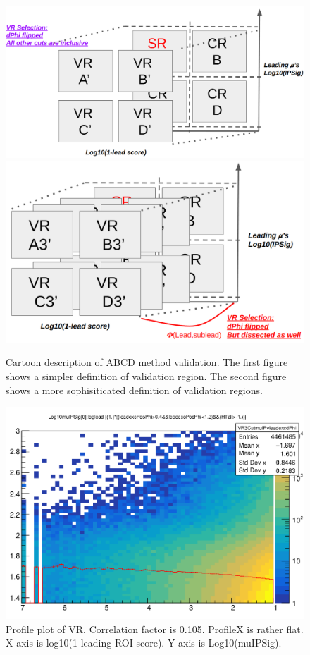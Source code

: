 \begin{figure}[h!]
  \label{fig:valcar}
  \centering
  \includegraphics[width=0.85\linewidth]{figs/SimpleVR.png}
  \includegraphics[width=0.85\linewidth]{figs/SophiVR.png}
  \caption{Cartoon description of ABCD method validation. The first figure shows a simpler definition of validation region. The second figure shows a more sophisiticated definition of validation regions. }

\end{figure}

\begin{figure}[h!]
  \label{fig:valcar}
  \centering
  \includegraphics[width=0.65\linewidth]{figs/VR3.png}
	\caption{Profile plot of VR. Correlation factor is 0.105. ProfileX is rather flat. X-axis is log10(1-leading ROI score). Y-axis is Log10(muIPSig).}

\end{figure}


